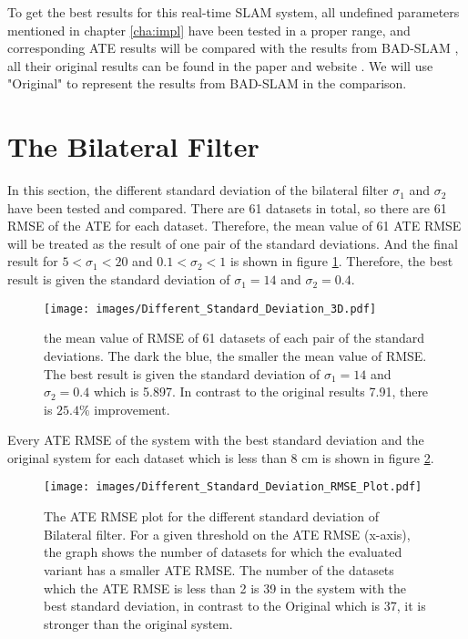 To get the best results for this real-time SLAM system, all undefined parameters mentioned in chapter \ref{cha:impl} have been tested in a proper range, and corresponding ATE results will be compared with the results from BAD-SLAM \parencite{8954208}, all their original results can be found in the paper and website \parencite{website:SLAM_Benchmark}. We will use "Original" to represent the results from BAD-SLAM in the comparison.

\section{The Bilateral Filter}
In this section, the different standard deviation of the bilateral filter $\sigma_{1}$ and $\sigma_2$ have been tested and compared. There are 61 datasets in total, so there are 61 RMSE of the ATE for each dataset. Therefore, the mean value of 61 ATE RMSE will be treated as the result of one pair of the standard deviations. And the final result for $5<\sigma_1<20$ and $0.1<\sigma_2<1$ is shown in figure \ref{Different_Standard_Deviation_3D}. Therefore, the best result is given the standard deviation of $\sigma_{1}=14$ and $\sigma_2=0.4$.
\begin{figure}[thb]
    \centering
    \texttt{[image: images/Different\_Standard\_Deviation\_3D.pdf]}
    \caption[the mean value of RMSE of 61 datasets of each pair of the standard deviations]{the mean value of RMSE of 61 datasets of each pair of the standard deviations. The dark the blue, the smaller the mean value of RMSE. The best result is given the standard deviation of $\sigma_{1}=14$ and $\sigma_2=0.4$ which is 5.897. In contrast to the original results 7.91, there is $25.4\%$ improvement.}\label{Different_Standard_Deviation_3D}
\end{figure}

Every ATE RMSE of the system with the best standard deviation and the original system for each dataset which is less than 8 cm is shown in figure \ref{Different_Standard_Deviation_RMSE_Plot}.
\begin{figure}[thb]
    \centering
    \texttt{[image: images/Different\_Standard\_Deviation\_RMSE\_Plot.pdf]}
    \caption[The RMSE plot for the different standard deviation of Bilateral filter]{The ATE RMSE plot for the different standard deviation of Bilateral filter. For a given threshold on the ATE RMSE (x-axis), the graph shows the number of datasets for which the evaluated variant has a smaller ATE RMSE. The number of the datasets which the ATE RMSE is less than 2 is 39 in the system with the best standard deviation, in contrast to the Original which is 37, it is stronger than the original system.}\label{Different_Standard_Deviation_RMSE_Plot}
\end{figure}

